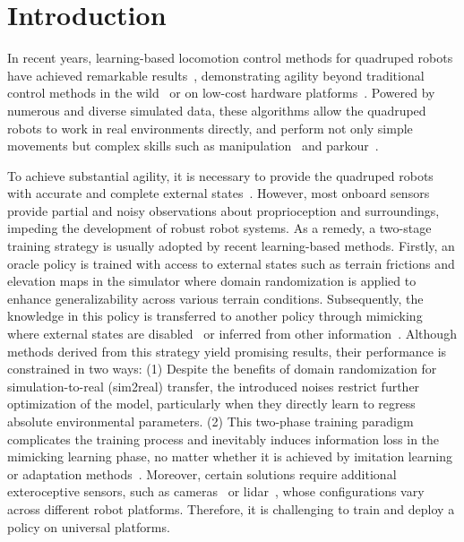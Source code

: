 \section{Introduction}

In recent years, learning-based locomotion control methods for quadruped robots have achieved remarkable results~\citep{hwangbo2019learning, peng2020learning, yang2020multi, xie2021dynamics, Imai2021VisionGuidedQL, yu2021visual, yang2022learning, margolis2022rapid, rudin2022learning, agrawal2022vision, yang2023neural, margolis2023walk, yang2023neural}, demonstrating agility beyond traditional control methods in the wild~\citep{lee2020learning, miki2022elevation} or on low-cost hardware platforms~\citep{kumar2021rma, wu2023learning}. Powered by numerous and diverse simulated data, these algorithms allow the quadruped robots to work in real environments directly, and perform not only simple movements but complex skills such as manipulation~\citep{fu2022deep, ji2023dribblebot, cheng2023legmanip} and parkour~\citep{yang2023generalized, zhuang2023robot, caluwaerts2023barkour}.

To achieve substantial agility, it is necessary to provide the quadruped robots with accurate and complete external states~\citep{hartley2018legged}. 
However, most onboard sensors provide partial and noisy observations about proprioception and surroundings, impeding the development of robust robot systems.
As a remedy, a two-stage training strategy is usually adopted by recent learning-based methods.
Firstly, an oracle policy is trained with access to external states such as terrain frictions and elevation maps in the simulator where domain randomization is applied to enhance generalizability across various terrain conditions.
Subsequently, the knowledge in this policy is transferred to another policy through mimicking where external states are disabled~\citep{miki2022learning} or inferred from other information~\citep{kumar2021rma}.
Although methods derived from this strategy yield promising results, their performance is constrained in two ways:
(1) Despite the benefits of domain randomization for simulation-to-real (sim2real) transfer, the introduced noises restrict further optimization of the model, particularly when they directly learn to regress absolute environmental parameters.
(2) This two-phase training paradigm complicates the training process and inevitably induces information loss in the mimicking learning phase, no matter whether it is achieved by imitation learning~\citep{miki2022learning} or adaptation methods~\citep{kumar2021rma}.
Moreover, certain solutions require additional exteroceptive sensors, such as cameras~\citep{agarwal2023legged} or lidar~\cite{rudin2022learning}, whose configurations vary across different robot platforms. Therefore, it is challenging to train and deploy a policy on universal platforms.

